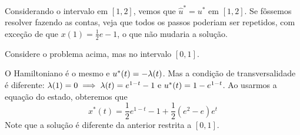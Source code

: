 Considerando o intervalo em $[1,2]$, vemos que $\hat{u}^* = u^*$ em $[1,2]$. Se fôssemos resolver 
fazendo as contas, veja que todos os passos poderiam ser repetidos, com exceção de que $x(1) = \frac{1}{2}e - 1$, 
o que não mudaria a solução. 

\begin{example}
    Considere o problema acima, mas no intervalo $[0,1]$. 
\end{example}

O Hamiltoniano é o mesmo e $u^*(t) = -\lambda(t)$. Mas a condição de transversalidade é diferente: 
$\lambda(1) = 0 \implies \lambda(t) = e^{1-t} - 1 \text{ e } u^{*}(t) = 1 - e^{1-t}$. 
Ao usarmos a equação do estado, obteremos que 
$$
x^*(t) = \frac{1}{2}e^{1-t} - 1 + \frac{1}{2}(e^2 - e)e^t
$$
Note que a solução é diferente da anterior restrita a $[0,1]$. 